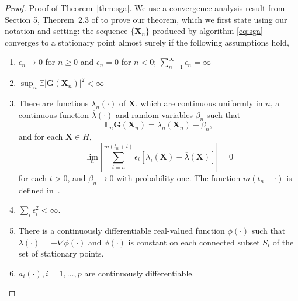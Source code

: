 \documentclass[paper=letter]{scrartcl}
\newcommand{\E}{\mathbb{E}}
\begin{document}
\begin{proof}{Proof of Theorem~\ref{thm:sga}.} We use a convergence analysis result from Section 5, Theorem~2.3 of \cite{kushner2003stochastic} to 
  prove our theorem, which we first state using 
  our notation and setting: the sequence $\{\bm{X}_n\}$ produced by algorithm \eqref{eq:sga}
  converges to a stationary point almost surely if the following assumptions hold, 
  \begin{enumerate}
    \item 
      $\epsilon_n \rightarrow 0$ for $n \geq 0$ and $\epsilon_n=0$ for $n<0$; 
      $\sum_{n=1}^{\infty} \epsilon_n = \infty$
    \item
      $\sup_n \E \left\vert\bm{G}(\bm{X}_n)\right\vert^2 < \infty$
    \item
      There are functions $\lambda_n(\cdot)$ of $\bm{X}$, which are continuous uniformly 
      in $n$, a continuous function $\overline{\lambda}(\cdot)$ and random variables 
      $\beta_n$ such that
      \begin{equation*}
        \E_n \bm{G}(\bm{X}_n) = \lambda_n(\bm{X}_n) + \beta_n,
      \end{equation*}
      and for each $\bm{X} \in H$,
      \begin{equation*}
        \lim_n \left\vert\sum_{i=n}^{m(t_n+t)} \epsilon_i [\lambda_i(\bm{X}) - \overline{\lambda}(\bm{X})] \right\vert = 0
      \end{equation*}
      for each $t>0$, and $\beta_n \rightarrow 0$ with probability one. The function $m(t_n + \cdot)$ is defined in~\cite[Section 5.1]{kushner2003stochastic}.
    \item
      $\sum_i \epsilon_i^2 < \infty$.
    \item
      There is a continuously differentiable real-valued function $\phi(\cdot)$ such that $\bar{\lambda}(\cdot) = - \nabla \phi(\cdot)$
      and $\phi(\cdot)$ is constant on each connected subset $S_i$ of the set of stationary points.
    \item 
      $a_i(\cdot), i=1,\ldots,p$ are continuously differentiable.
  \end{enumerate}
  

\end{proof}
\end{document}
